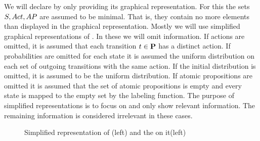 \documentclass[preview]{standalone}
\begin{document}
\begin{exmp}
We will declare \mdpsN by only providing its graphical representation. For this the sets ${S}, {Act}, {AP}$ are assumed to be minimal. That is, they contain no more elements than displayed in the graphical representation. Mostly we will use simplified graphical representations of \mdpsN. In these we will omit information. If actions are omitted, it is assumed that each transition $t \in {\ensuremath{{\textbf{P}}}}$ has a distinct action. If probabilities are omitted for each state it is assumed the uniform distribution on each set of outgoing transitions with the same action. If the initial distribution is omitted, it is assumed to be the uniform distribution. If atomic propositions are omitted it is assumed that the set of atomic propositions is empty and every state is mapped to the empty set by the labeling function. The purpose of simplified representations is to focus on and only show relevant information. The remaining information is considered irrelevant in these cases.

\begin{figure}[!htb]
	\centering 
	\caption{Simplified representation of \mdp (left) and the \viewN \viewinitstates on it(left)}
	\label{fig:exampleMdp}  
\end{figure}
\end{exmp}
\end{document}
